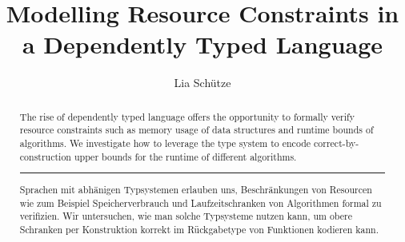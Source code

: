 \documentclass[12pt]{report}
\title{
	{Modelling Resource Constraints in a Dependently Typed Language}
}
\author{Lia Schütze}
\begin{document}
    \maketitle

    \begin{abstract}
	   The rise of dependently typed language offers the opportunity to formally verify resource constraints such as memory usage of data structures and runtime bounds of algorithms. We investigate how to leverage the type system to encode correct-by-construction upper bounds for the runtime of different algorithms.

       \bigskip
       \noindent\rule{\linewidth}{.5pt}
       \bigskip

       Sprachen mit abhänigen Typsystemen erlauben uns, Beschränkungen von Resourcen wie zum Beispiel Speicherverbrauch und Laufzeitschranken von Algorithmen formal zu verifizien. Wir untersuchen, wie man solche Typsysteme nutzen kann, um obere Schranken per Konstruktion korrekt im Rückgabetype von Funktionen kodieren kann.
	\end{abstract}

	\tableofcontents

	
    
    
    
    
    
    
    

	\printbibliography
\end{document}
